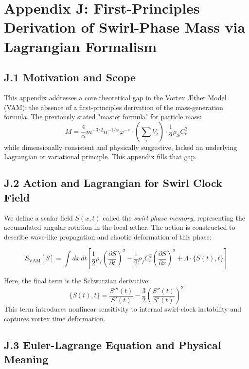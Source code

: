 \section*{Appendix J: First-Principles Derivation of Swirl-Phase Mass via Lagrangian Formalism}

\subsection*{J.1 Motivation and Scope}

This appendix addresses a core theoretical gap in the Vortex \AE{}ther Model (VAM): the absence of a first-principles derivation of the mass-generation formula. The previously stated "master formula" for particle mass:
\[
M = \frac{4}{\alpha} m^{-3/2} n^{-1/\varphi} \varphi^{-s} \cdot \left( \sum_i V_i \right) \cdot \frac{1}{2} \rho_{\text{\ae}} C_e^2
\]
while dimensionally consistent and physically suggestive, lacked an underlying Lagrangian or variational principle. This appendix fills that gap.

\subsection*{J.2 Action and Lagrangian for Swirl Clock Field}

We define a scalar field $S(x,t)$ called the \textit{swirl phase memory}, representing the accumulated angular rotation in the local æther. The action is constructed to describe wave-like propagation and chaotic deformation of this phase:

\[
S_{\text{VAM}}[S] = \int dx \, dt \left[
\frac{1}{2} \rho_{\scriptscriptstyle\boldsymbol\!f} \left( \frac{\partial S}{\partial t} \right)^2
- \frac{1}{2} \rho_{\scriptscriptstyle\boldsymbol\!f} C_e^2 \left( \frac{\partial S}{\partial x} \right)^2
+ \Lambda \cdot \{ S(t), t \}
\right]
\]

Here, the final term is the Schwarzian derivative:
\[
\{S(t), t\} = \frac{S'''(t)}{S'(t)} - \frac{3}{2} \left( \frac{S''(t)}{S'(t)} \right)^2
\]
This term introduces nonlinear sensitivity to internal swirl-clock instability and captures vortex time deformation.

\subsection*{J.3 Euler-Lagrange Equation and Physical Meaning}


